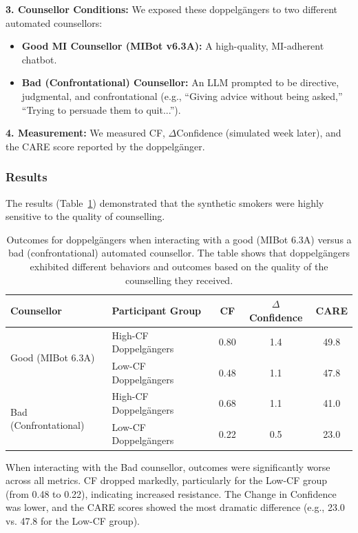 \textbf{3. Counsellor Conditions:} We exposed these doppelgängers to two different automated counsellors:
\begin{itemize}
    \item \textbf{Good MI Counsellor (MIBot v6.3A):} A high-quality, MI-adherent chatbot.
    \item \textbf{Bad (Confrontational) Counsellor:} An LLM prompted to be directive, judgmental, and confrontational (e.g., ``Giving advice without being asked,'' ``Trying to persuade them to quit...'').
\end{itemize}

\textbf{4. Measurement:} We measured CF, $\Delta$Confidence (simulated week later), and the CARE score reported by the doppelgänger.

\subsubsection{Results}

The results (Table~\ref{tab:good-vs-bad-counselling}) demonstrated that the synthetic smokers were highly sensitive to the quality of counselling.

\begin{table}[h!]
\centering
\caption[Doppelgänger Outcomes with Good vs. Bad Counselling]{Outcomes for doppelgängers when interacting with a good (MIBot 6.3A) versus a bad (confrontational) automated counsellor. The table shows that doppelgängers exhibited different behaviors and outcomes based on the quality of the counselling they received.}
\label{tab:good-vs-bad-counselling}
\begin{tabular}{@{}llccc@{}}
\toprule
\textbf{Counsellor} & \textbf{Participant Group} & \textbf{CF} & \textbf{$\Delta$Confidence} & \textbf{CARE} \\ \midrule
\multirow{2}{*}{Good (MIBot 6.3A)} & High-CF Doppelgängers & 0.80 & 1.4 & 49.8 \\
 & Low-CF Doppelgängers & 0.48 & 1.1 & 47.8 \\ \midrule
\multirow{2}{*}{Bad (Confrontational)} & High-CF Doppelgängers & 0.68 & 1.1 & 41.0 \\
 & Low-CF Doppelgängers & 0.22 & 0.5 & 23.0 \\ \bottomrule
\end{tabular}
\end{table}

When interacting with the Bad counsellor, outcomes were significantly worse across all metrics. CF dropped markedly, particularly for the Low-CF group (from 0.48 to 0.22), indicating increased resistance. The Change in Confidence was lower, and the CARE scores showed the most dramatic difference (e.g., 23.0 vs. 47.8 for the Low-CF group).

